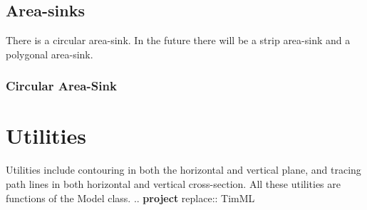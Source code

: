 \documentclass[letterpaper,10pt,english]{sphinxmanual}
\begin{document}
\subsection{Area-sinks}
\label{\detokenize{areasinks/areasinkindex:area-sinks}}\label{\detokenize{areasinks/areasinkindex::doc}}
There is a circular area-sink. In the future there will be a strip area-sink and a polygonal area-sink.


\subsubsection{Circular Area-Sink}
\label{\detokenize{areasinks/circareasink:circular-area-sink}}\label{\detokenize{areasinks/circareasink::doc}}

\begin{fulllineitems}
\label{\detokenize{areasinks/circareasink:timml.circareasink.CircAreaSink}}
\end{fulllineitems}



\section{Utilities}
\label{\detokenize{utils/utils:utilities}}\label{\detokenize{utils/utils::doc}}
Utilities include contouring in both the horizontal and vertical plane, and tracing path lines in both horizontal and vertical cross-section.
All these utilities are functions of the Model class.
.. {\color{red}\bfseries{}\textbar{}project\textbar{}} replace:: TimML



\renewcommand{\indexname}{Index}
\printindex
\end{document}

